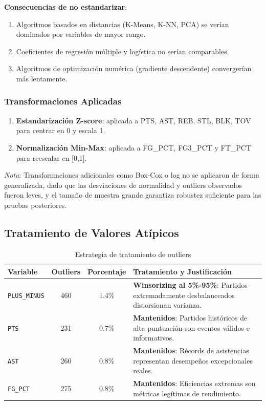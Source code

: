 \documentclass[12pt]{article}
\begin{document}
\textbf{Consecuencias de no estandarizar}:

\begin{enumerate}
\item Algoritmos basados en distancias (K-Means, K-NN, PCA) se verían dominados por variables de mayor rango.
\item Coeficientes de regresión múltiple y logística no serían comparables.
\item Algoritmos de optimización numérica (gradiente descendente) convergerían más lentamente.
\end{enumerate}

\subsubsection{Transformaciones Aplicadas}

\begin{enumerate}
\item \textbf{Estandarización Z-score}: aplicada a PTS, AST, REB, STL, BLK, TOV para centrar en 0 y escala 1.

\item \textbf{Normalización Min-Max}: aplicada a FG\_PCT, FG3\_PCT y FT\_PCT para reescalar en [0,1].

\end{enumerate}

\textit{Nota}: Transformaciones adicionales como Box-Cox o log no se aplicaron de forma generalizada, dado que las desviaciones de normalidad y outliers observados fueron leves, y el tamaño de muestra grande garantiza robustez suficiente para las pruebas posteriores.

\subsection{Tratamiento de Valores Atípicos}
\label{subsec:tratamiento-outliers}

\begin{table}[H]
\centering
\begin{tabular}{|l|c|c|p{}|}
\hline
\textbf{Variable} & \textbf{Outliers} & \textbf{Porcentaje} & \textbf{Tratamiento y Justificación} \\
\hline
\texttt{PLUS\_MINUS} & 460 & 1.4\% & \textbf{Winsorizing al 5\%-95\%}: Partidos extremadamente desbalanceados distorsionan varianza.\\
\hline
\texttt{PTS} & 231 & 0.7\% & \textbf{Mantenidos}: Partidos históricos de alta puntuación son eventos válidos e informativos.\\
\hline
\texttt{AST} & 260 & 0.8\% & \textbf{Mantenidos}: Récords de asistencias representan desempeños excepcionales reales.\\
\hline
\texttt{FG\_PCT} & 275 & 0.8\% & \textbf{Mantenidos}: Eficiencias extremas son métricas legítimas de rendimiento.\\
\hline
\end{tabular}
\caption{Estrategia de tratamiento de outliers}
\label{tab:tratamiento-outliers}
\end{table}
\end{document}
